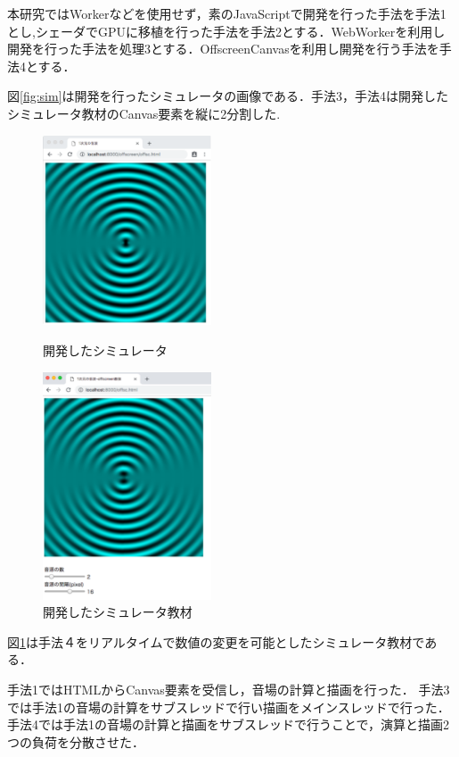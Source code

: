 \documentclass[a4j,12pt]{jsarticle}
\begin{document}
本研究ではWorkerなどを使用せず，素のJavaScriptで開発を行った手法を手法1とし,シェーダでGPUに移植を行った手法を手法2とする．WebWorkerを利用し開発を行った手法を処理3とする．OffscreenCanvasを利用し開発を行う手法を手法4とする．

図\ref{fig:sim}は開発を行ったシミュレータの画像である．手法3，手法4は開発したシミュレータ教材のCanvas要素を縦に2分割した.

\begin{figure}[htbp]
 \begin{minipage}{0.5\hsize}
  \begin{center}
   \includegraphics[width=50mm]{sim.pdf}
  \end{center}
  \caption{開発したシミュレータ}
  \label{fig:sim}
 \end{minipage}
 \begin{minipage}{0.5\hsize}
  \begin{center}
   \includegraphics[width=50mm]{kYouzai.pdf}
  \end{center}
  \caption{開発したシミュレータ教材}
  \label{fig:sim2}
 \end{minipage}
\end{figure}

図\ref{fig:sim2}は手法４をリアルタイムで数値の変更を可能としたシミュレータ教材である．

手法1ではHTMLからCanvas要素を受信し，音場の計算と描画を行った．
手法3では手法1の音場の計算をサブスレッドで行い描画をメインスレッドで行った．
手法4では手法1の音場の計算と描画をサブスレッドで行うことで，演算と描画2つの負荷を分散させた．
\end{document}
